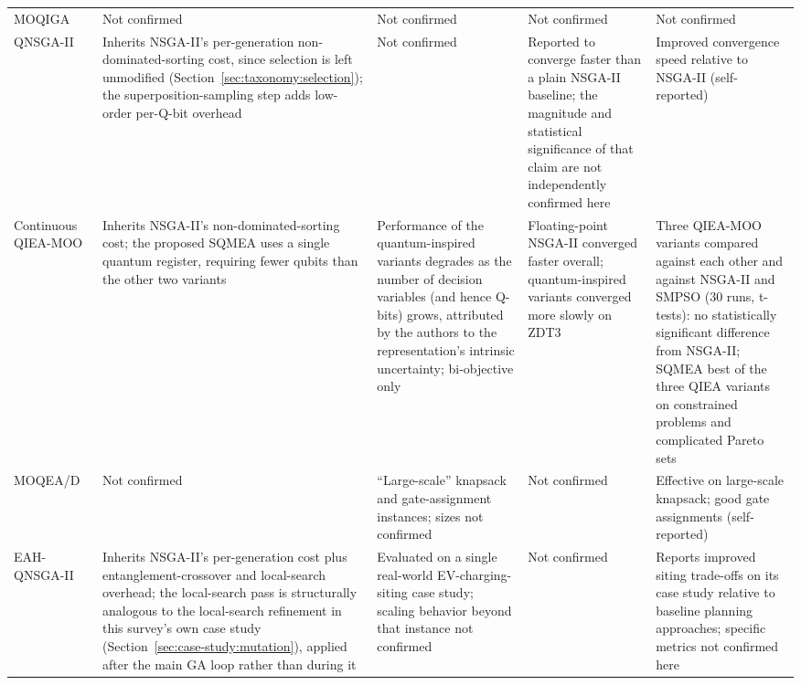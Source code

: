 \begin{xltabular}{\fulllength}{@{}p{2.1cm}XXXX@{}}
    MOQIGA~\citep{hussain2022moqiga} &
      Not confirmed & Not confirmed & Not confirmed & Not confirmed \\
    QNSGA-II~\citep{guzel2022qnsga2} &
      Inherits NSGA-II's per-generation non-dominated-sorting cost,
      since selection is left unmodified (Section~\ref{sec:taxonomy:selection});
      the superposition-sampling step adds low-order per-Q-bit overhead &
      Not confirmed &
      Reported to converge faster than a plain NSGA-II baseline; the
      magnitude and statistical significance of that claim are not
      independently confirmed here &
      Improved convergence speed relative to NSGA-II (self-reported) \\
    Continuous QIEA-MOO~\citep{olvera2023continuous} &
      Inherits NSGA-II's non-dominated-sorting cost; the proposed SQMEA
      uses a single quantum register, requiring fewer qubits than the
      other two variants &
      Performance of the quantum-inspired variants degrades as the
      number of decision variables (and hence Q-bits) grows, attributed
      by the authors to the representation's intrinsic uncertainty;
      bi-objective only &
      Floating-point NSGA-II converged faster overall; quantum-inspired
      variants converged more slowly on ZDT3 &
      Three QIEA-MOO variants compared against each other and against
      NSGA-II and SMPSO (30 runs, t-tests): no statistically significant
      difference from NSGA-II; SQMEA best of the three QIEA variants on
      constrained problems and complicated Pareto sets \\
    MOQEA/D~\citep{deng2024moqead} &
      Not confirmed &
      ``Large-scale'' knapsack and gate-assignment instances; sizes not
      confirmed &
      Not confirmed &
      Effective on large-scale knapsack; good gate assignments
      (self-reported) \\
    EAH-QNSGA-II~\citep{kumar2026eahqnsga2} &
      Inherits NSGA-II's per-generation cost plus entanglement-crossover
      and local-search overhead; the local-search pass is structurally
      analogous to the local-search refinement in this survey's own case
      study (Section~\ref{sec:case-study:mutation}), applied after the
      main GA loop rather than during it &
      Evaluated on a single real-world EV-charging-siting case study;
      scaling behavior beyond that instance not confirmed &
      Not confirmed &
      Reports improved siting trade-offs on its case study relative to
      baseline planning approaches; specific metrics not confirmed here \\
\end{xltabular}
\endgroup

